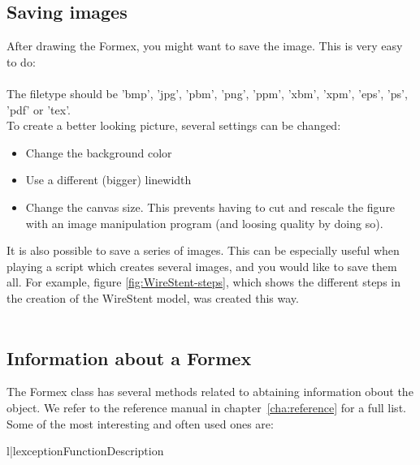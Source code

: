 \subsection{Saving images}
\outdated

\label{subsec:images}
After drawing the Formex, you might want to save the image. This is very easy to do:\\
\\
The filetype should be 'bmp', 'jpg', 'pbm', 'png', 'ppm', 'xbm', 'xpm', 'eps', 'ps', 'pdf' or 'tex'. \\
To create a better looking picture, several settings can be changed:
\begin{itemize}
	\item Change the background color 
	\item Use a different (bigger) linewidth 
	\item Change the canvas size. This prevents having to cut and rescale the figure with an image manipulation program (and loosing quality by doing so).  
\end{itemize}

It is also possible to save a series of images. This can be especially useful when playing a script which creates several images, and you would like to save them all.  For example, figure \ref{fig:WireStent-steps}, which shows the different steps in the creation of the WireStent model, was created this way.\\
\\


\subsection{Information about a Formex}
\label{subsec:info}

The Formex class has several methods related to abtaining information obout the object. We refer to the reference manual in chapter~\ref{cha:reference} for a full list. Some of the most interesting and often used ones are:
\begin{tableii}{l|l}{exception}{Function}{Description}
\end{tableii}


